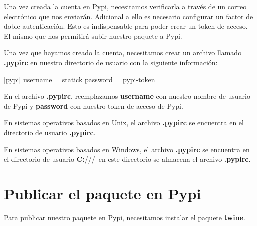 \documentclass[
  a4paper,
  DIV=11,
  numbers=noendperiod,
  onepage,
  openany]{scrreprt}
\newenvironment{Shaded}{\begin{snugshade}}{\end{snugshade}}
\newcommand{\NormalTok}[1]{\textcolor[rgb]{0.00,0.23,0.31}{#1}}
\begin{document}
\begin{tcolorbox}
\begin{tcolorbox}
Una vez creada la cuenta en Pypi, necesitamos verificarla a través de un
correo electrónico que nos enviarán. Adicional a ello es necesario
configurar un factor de doble autenticación. Esto es indispensable para
poder crear un token de acceso. El mismo que nos permitirá subir nuestro
paquete a Pypi.

\end{tcolorbox}

Una vez que hayamos creado la cuenta, necesitamos crear un archivo
llamado \textbf{.pypirc} en nuestro directorio de usuario con la
siguiente información:

\begin{Shaded}
\begin{Highlighting}[]
\NormalTok{[pypi]}
\NormalTok{  username = statick}
\NormalTok{  password = pypi{-}token}
\end{Highlighting}
\end{Shaded}

En el archivo \textbf{.pypirc}, reemplazamos \textbf{username} con
nuestro nombre de usuario de Pypi y \textbf{password} con nuestro token
de acceso de Pypi.

\begin{tcolorbox}[enhanced jigsaw, rightrule=.15mm, toprule=.15mm, colframe=quarto-callout-tip-color-frame, colback=white, title=\textcolor{quarto-callout-tip-color}{\faLightbulb}\hspace{0.5em}{Tip}, opacitybacktitle=0.6, opacityback=0, breakable, bottomtitle=1mm, left=2mm, leftrule=.75mm, colbacktitle=quarto-callout-tip-color!10!white, arc=.35mm, bottomrule=.15mm, titlerule=0mm, toptitle=1mm, coltitle=black]

En sistemas operativos basados en Unix, el archivo \textbf{.pypirc} se
encuentra en el directorio de usuario \textbf{.pypirc}.

En sistemas operativos basados en Windows, el archivo \textbf{.pypirc}
se encuentra en el directorio de usuario
\textbf{C:}/\Users/\username/~en este directorio se almacena el archivo
\textbf{.pypirc}.

\end{tcolorbox}

\chapter{Publicar el paquete en Pypi}\label{publicar-el-paquete-en-pypi}

Para publicar nuestro paquete en Pypi, necesitamos instalar el paquete
\textbf{twine}.


\end{tcolorbox}
\end{document}
